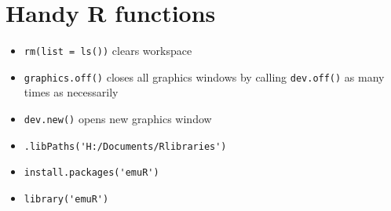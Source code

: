 \documentclass{article}
\begin{document}
\section*{Handy R functions}
\begin{itemize}
    \item \verb|rm(list = ls())| clears workspace
    \item \verb|graphics.off()| closes all graphics windows by calling \verb|dev.off()| as many times as necessarily
    \item \verb|dev.new()| opens new graphics window
    \item \verb|.libPaths('H:/Documents/Rlibraries')|
    \item \verb|install.packages('emuR')|
    \item \verb|library('emuR')|
\end{itemize}
\end{document}
